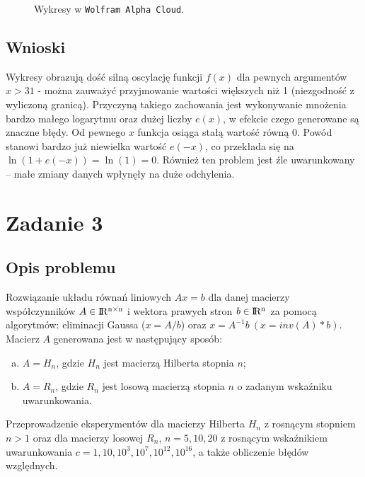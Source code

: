 \documentclass{classrep}
\begin{document}
		\begin{figure}[hpbt]
			\centering
			 \hfill
  			\caption{Wykresy w \texttt{Wolfram Alpha Cloud}.}
  			\label{fig:3}
		\end{figure}
		
	\subsection{Wnioski}
		Wykresy obrazują dość silną oscylację funkcji $f(x)$ dla pewnych argumentów $x > 31$ - można zauważyć przyjmowanie wartości większych niż 1 (niezgodność z wyliczoną granicą). Przyczyną takiego zachowania jest wykonywanie mnożenia bardzo małego logarytmu oraz dużej liczby $e(x)$, w efekcie czego generowane są znaczne błędy. Od pewnego $x$ funkcja osiąga stałą wartość równą 0. Powód stanowi bardzo już niewielka wartość $e(-x)$, co przekłada się na $\ln(1+e(-x))=\ln(1)=0$. Również ten problem jest źle uwarunkowany -- małe zmiany danych wpłynęły na duże odchylenia.
		
\section{Zadanie 3}
	\subsection{Opis problemu}
		Rozwiązanie układu równań liniowych $Ax = b$ dla danej macierzy współczynników $A \in {\rm I\!R^{n \times n}}$ i wektora prawych stron $b \in {\rm I\!R^n}$ za pomocą algorytmów: eliminacji Gaussa ($x=A/b$) oraz $x = A^{-1}b ~(x=inv(A)*b)$. 
		Macierz $A$ generowana jest w następujący sposób:
		\begin{enumerate}[(a)]
			\item $A = H_n$, gdzie $H_n$ jest macierzą Hilberta stopnia $n$;
			\item $A = R_n$, gdzie $R_n$ jest losową macierzą stopnia $n$ o zadanym wskaźniku uwarunkowania.
		\end{enumerate}
		Przeprowadzenie eksperymentów dla macierzy Hilberta $H_n$ z rosnącym stopniem $n > 1$ oraz dla macierzy losowej $R_n$, $n = 5, 10, 20$ z rosnącym wskaźnikiem uwarunkowania $c = 1, 10, 10^3, 10^7, 10^{12}, 10^{16}$, a także obliczenie błędów względnych.
\end{document}
